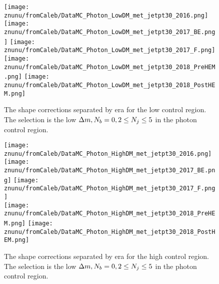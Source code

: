 \begin{figure}[!h]
	\begin{center}
  \texttt{[image: znunu/fromCaleb/DataMC\_Photon\_LowDM\_met\_jetpt30\_2016.png]} \\
  \texttt{[image: znunu/fromCaleb/DataMC\_Photon\_LowDM\_met\_jetpt30\_2017\_BE.png]} 
  \texttt{[image: znunu/fromCaleb/DataMC\_Photon\_LowDM\_met\_jetpt30\_2017\_F.png]} \\
  \texttt{[image: znunu/fromCaleb/DataMC\_Photon\_LowDM\_met\_jetpt30\_2018\_PreHEM.png]}
  \texttt{[image: znunu/fromCaleb/DataMC\_Photon\_LowDM\_met\_jetpt30\_2018\_PostHEM.png]} \\
	\end{center}
	\caption[\Znunu{} Shape by Era]{The \Znunu{} shape corrections separated by era for the low \dm{} control region. The selection is the low $\Delta m, N_{b}=0, 2\leq N_{j}\leq5$ in the photon control region.
	 }
	\label{fig:znunu-shape-lm-photon}
\end{figure}

\begin{figure}[!h]
	\begin{center}
  \texttt{[image: znunu/fromCaleb/DataMC\_Photon\_HighDM\_met\_jetpt30\_2016.png]} \\
  \texttt{[image: znunu/fromCaleb/DataMC\_Photon\_HighDM\_met\_jetpt30\_2017\_BE.png]} 
  \texttt{[image: znunu/fromCaleb/DataMC\_Photon\_HighDM\_met\_jetpt30\_2017\_F.png]} \\
  \texttt{[image: znunu/fromCaleb/DataMC\_Photon\_HighDM\_met\_jetpt30\_2018\_PreHEM.png]}
  \texttt{[image: znunu/fromCaleb/DataMC\_Photon\_HighDM\_met\_jetpt30\_2018\_PostHEM.png]} \\
	\end{center}
	\caption[\Znunu{} Shape by Era]{The \Znunu{} shape corrections separated by era for the high \dm{} control region. The selection is the low $\Delta m, N_{b}=0, 2\leq N_{j}\leq5$ in the photon control region.
	 }
	\label{fig:znunu-shape-hm-photon}
\end{figure}
